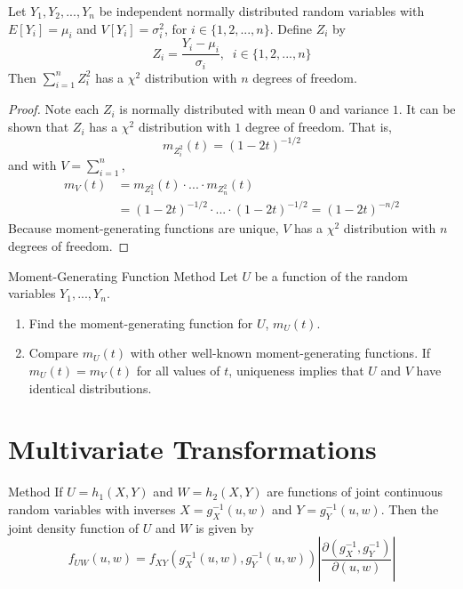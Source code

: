 \documentclass[12pt, a4paper, twoside, openright, titlepage]{book}
\begin{document}
\begin{thm}{}{}
    Let $Y_1,Y_2,...,Y_n$ be independent normally distributed random variables with $E[Y_i] = \mu_i$ and $V[Y_i] = \sigma_i^2$, for $i \in \{1,2,...,n\}$. Define $Z_i$ by \begin{equation*}
        Z_i = \frac{Y_i - \mu_i}{\sigma_i},\;\;i\in\{1,2,...,n\}
    \end{equation*}
    Then $\sum\limits_{i=1}^nZ_i^2$ has a $\chi^2$ distribution with $n$ degrees of freedom.
\end{thm}
\begin{proof}{}{}
    Note each $Z_i$ is normally distributed with mean $0$ and variance $1$. It can be shown that $Z_i$ has a $\chi^2$ distribution with $1$ degree of freedom. That is, \begin{equation*}
        m_{Z_i^2}(t) = (1-2t)^{-1/2}
    \end{equation*}
    and with $V = \sum\limits_{i=1}^n$, \begin{align*}
        m_V(t) &= m_{Z_1^2}(t)\cdot ... \cdot m_{Z_n^2}(t) \\
        &= (1-2t)^{-1/2} \cdot ...\cdot (1-2t)^{-1/2} = (1-2t)^{-n/2}
    \end{align*}
    Because moment-generating functions are unique, $V$ has a $\chi^2$ distribution with $n$ degrees of freedom.
\end{proof}

\begin{defn}{Moment-Generating Function Method}{}
    Let $U$ be a function of the random variables $Y_1,...,Y_n$. \begin{enumerate}
        \item Find the moment-generating function for $U$, $m_U(t)$.
        \item Compare $m_U(t)$ with other well-known moment-generating functions. If $m_U(t) = m_V(t)$ for all values of $t$, uniqueness implies that $U$ and $V$ have identical distributions.
    \end{enumerate}
\end{defn}


\section{\textsection Multivariate Transformations}

\begin{defn}{Method}{}
    If $U = h_1(X,Y)$ and $W = h_2(X,Y)$ are functions of joint continuous random variables with inverses $X = g_X^{-1}(u,w)$ and $Y = g_Y^{-1}(u,w)$. Then the joint density function of $U$ and $W$ is given by \begin{equation*}
        f_{UW}(u,w) = f_{XY}(g_X^{-1}(u,w),g_Y^{-1}(u,w))\left|\frac{\partial(g_X^{-1},g_Y^{-1})}{\partial(u,w)}\right|
    \end{equation*}
\end{defn}
\end{document}
